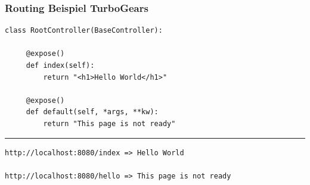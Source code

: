 \documentclass[
    t,
    smaller,
    compress,
    xcolor=svgnames,            %
    table,
]{beamer}
\begin{document}
\begin{frame}[fragile]

\frametitle{Routing Beispiel TurboGears}

\begin{lstlisting}
class RootController(BaseController):

     @expose()
     def index(self):
         return "<h1>Hello World</h1>"

     @expose()
     def default(self, *args, **kw):
         return "This page is not ready"
\end{lstlisting}
\hrule
    \vspace{10pt}
\begin{lstlisting}
http://localhost:8080/index => Hello World

http://localhost:8080/hello => This page is not ready
\end{lstlisting}


\end{frame}

%
\end{document}
